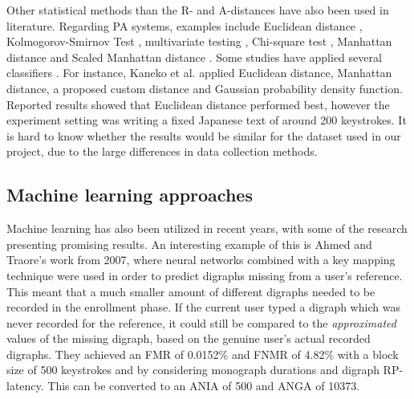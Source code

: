 Other statistical methods than the R- and A-distances have also been used in literature.
Regarding PA systems, examples include Euclidean distance \cite{Kaneko, Monrose, Harun, Tappert}, Kolmogorov-Smirnov Test \cite{park, KANG201572}, multivariate testing \cite{KANG201572}, Chi-square test \cite{chi-square}, Manhattan distance \cite{Kaneko, Harun, cognition} and Scaled Manhattan distance \cite{Harun}.
Some studies have applied several classifiers \cite{hu, mondal, KANG201572, Harun, cognition, Kaneko}. 
For instance, Kaneko et al. \cite{Kaneko} applied Euclidean distance, Manhattan distance, a proposed custom distance and Gaussian probability density function. 
Reported results showed that Euclidean distance performed best, however the experiment setting was writing a fixed Japanese text of around 200 keystrokes.
It is hard to know whether the results would be similar for the dataset used in our project, due to the large differences in data collection methods.

\subsection{Machine learning approaches}
Machine learning has also been utilized in recent years, with some of the research presenting promising results.
An interesting example of this is Ahmed and Traore's \cite{Ahmed} work from 2007, where neural networks combined with a key mapping technique were used in order to predict digraphs missing from a user's reference.
This meant that a much smaller amount of different digraphs needed to be recorded in the enrollment phase.
If the current user typed a digraph which was never recorded for the reference, it could still be compared to the \textit{approximated} values of the missing digraph, based on the genuine user's actual recorded digraphs.
They achieved an FMR of 0.0152\% and FNMR of 4.82\% with a block size of 500 keystrokes and by considering monograph durations and digraph RP-latency.
This can be converted to an ANIA of 500 and ANGA of 10373.

